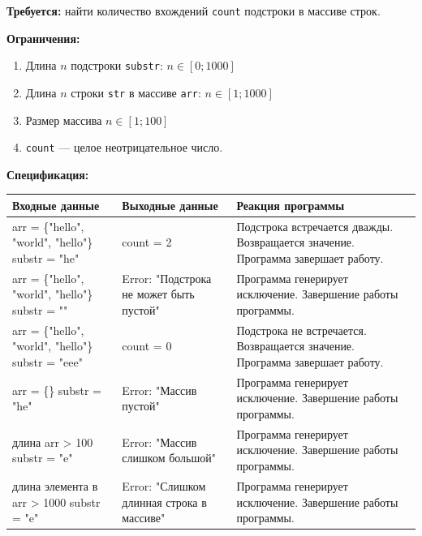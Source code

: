 \documentclass{article}[14pt]
\begin{document}
\noindent \textbf{Требуется:} найти количество вхождений \texttt{count} подстроки в массиве строк.
 
\noindent \textbf{Ограничения:}

\begin{enumerate}
	\item Длина $n$ подстроки \texttt{substr}: $n \in [0; 1000]$
	\item Длина $n$ строки \texttt{str} в массиве \texttt{arr}: $n \in [1; 1000]$
	\item Размер массива $n \in [1; 100]$
	\item \texttt{count} --- целое неотрицательное число.
\end{enumerate}

\noindent \textbf{Спецификация:}

\begin{table}[h!]
\centering
\begin{tabularx}{\textwidth}{|X|X|X|}
\hline
\textbf{Входные данные} & \textbf{Выходные данные} & \textbf{Реакция программы} \\
\hline
arr = \{"hello", "world", "hello"\} \newline substr = "he" &
count = 2 &
Подстрока встречается дважды. Возвращается значение. Программа завершает работу. \\
\hline
arr = \{"hello", "world", "hello"\} \newline substr = "" &
Error: "Подстрока не может быть пустой" &
Программа генерирует исключение. Завершение работы программы. \\
\hline
arr = \{"hello", "world", "hello"\} \newline substr = "eee" &
count = 0 &
Подстрока не встречается. Возвращается значение. Программа завершает работу. \\
\hline
arr = \{\} \newline substr = "he" &
Error: "Массив пустой" &
Программа генерирует исключение. Завершение работы программы. \\
\hline
длина arr > 100 \newline substr = "e" &
Error: "Массив слишком большой" &
Программа генерирует исключение. Завершение работы программы. \\
\hline
длина элемента в arr > 1000 \newline substr = "e" &
Error: "Слишком длинная строка в массиве" &
Программа генерирует исключение. Завершение работы программы. \\
\hline
\end{tabularx}
\end{table}
\end{document}
